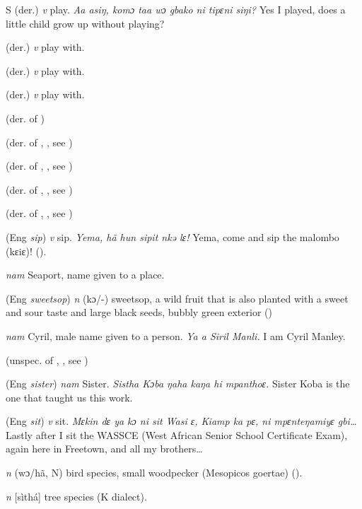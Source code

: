 \begin{letter}{S}
 (der.) \textit{v} play. \textit{Aa asiŋ, komɔ taa wɔ gbako ni tipɛni siŋi?} Yes I played, does a little child grow up without playing?

 (der.) \textit{v} play with.

 (der.) \textit{v} play with.

 (der.) \textit{v} play with.

 (der. of ) 

 (der. of , , see ) 

 (der. of , , see ) 

 (der. of , , see ) 

 (der. of , , see ) 

 (Eng \textit{sip}) \textit{v} sip. \textit{Yema, hã hun sipit nkə lɛ!} Yema, come and sip the malombo (kɛiɛ)! (\citealt{Pichl1967}). 

 \textit{nam} Seaport, name given to a place. 

 (Eng \textit{sweetsop}) \textit{n} (kɔ/-) sweetsop, a wild fruit that is also planted with a sweet and sour taste and large black seeds, bubbly green exterior (\citealt{Pichl1967})

 \textit{nam} Cyril, male name given to a person. \textit{Ya a Siril Manli.} I am Cyril Manley.

 (unspec. of , , see ) 

 (Eng \textit{sister}) \textit{nam} Sister. \textit{Sistha Kɔba ŋaha kaŋa hi mpanthoɛ.} Sister Koba is the one that taught us this work.

 (Eng \textit{sit}) \textit{v} sit. \textit{Mɛkin dɛ ya kɔ ni sit Wasi ɛ, Kiamp ka pɛ, ni mpɛnteŋamiyɛ gbi…} Lastly after I sit the WASSCE (West African Senior School Certificate Exam), again here in Freetown, and all my brothers…

 \textit{n} (wɔ/hã, N) bird species, small woodpecker (Mesopicos goertae) (\citealt{Pichl1967}). 

 \textit{n} [sìthá] tree species (K dialect). 


\end{letter}
